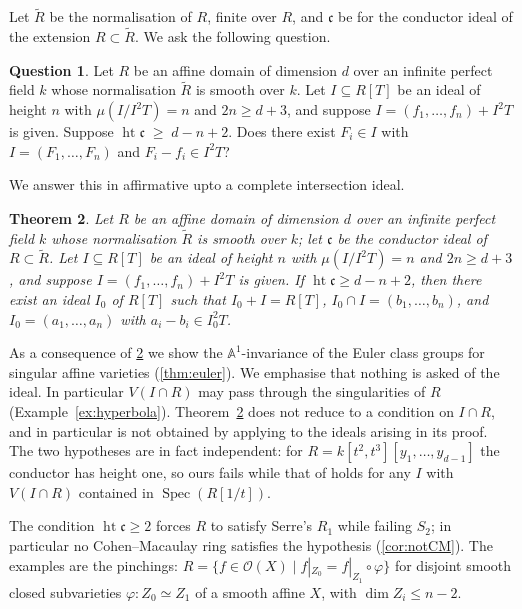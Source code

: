 \documentclass[11pt,reqno]{amsart}
\theoremstyle{plain}
\newtheorem{theorem}{Theorem}[section]
\theoremstyle{definition}
\newtheorem{question}[theorem]{Question}
\newcommand{\Spec}{\operatorname{Spec}}
\newcommand{\hgt}{\operatorname{ht}}
\newcommand{\Rt}{\widetilde{R}}
\newcommand{\cc}{\mathfrak{c}}
\begin{document}
Let $\Rt$ be the
normalisation of $R$, finite over $R$, and $\cc$  be for the conductor ideal of the extension $R\subset  \Rt$. We ask the following question.

\begin{question}\label{thm:question-intro}
Let $R$ be an affine domain of dimension $d$ over an infinite perfect field $k$ whose
normalisation $\Rt$ is smooth over $k$. Let $I\subseteq R[T]$ be an ideal of height $n$ with
$\mu(I/I^2T)=n$ and $2n\ge d+3$, and suppose $I=(f_1,\dots,f_n)+I^2T$ is given. Suppose $\hgt\cc\;\ge\;d-n+2$. Does there exist $F_i\in I$ with $I=(F_1,\dots,F_n)$ and $F_i-f_i\in I^2T$?
\end{question}
We answer this in affirmative upto a complete intersection ideal.
\begin{theorem}\label{thm:main-intro}
Let $R$ be an affine domain of dimension $d$ over an infinite perfect field $k$ whose
normalisation $\Rt$ is smooth over $k$; let $\cc$ be the conductor ideal of $R\subset \Rt$. Let $I\subseteq R[T]$ be an ideal
of height $n$ with $\mu(I/I^2T)=n$ and $2n\ge d+3$, and suppose $I=(f_1,\dots,f_n)+I^2T$ is
given. If $\hgt\cc\ge d-n+2$, then there exist an ideal $I_0$ of $R[T]$ such that $I_0+I=R[T]$, $I_0\cap I=(b_1,\ldots,b_n)$, and $I_0=(a_1,\ldots,a_n)$ with $a_i-b_i\in I_0^2T$.

\end{theorem}
As a consequence of \ref{thm:main-intro} we show the $\mathbb{A}^1$-invariance of the Euler class groups for singular affine varieties (\ref{thm:euler}).
We emphasise that nothing is asked of the
ideal. In particular $V(I\cap R)$ may pass through the singularities of $R$ (Example~\ref{ex:hyperbola}). Theorem~\ref{thm:main-intro} does not reduce to a condition on $I\cap R$, and in particular is
not obtained by applying \cite[Theorem 4.5]{BD} to the ideals arising in its proof. The two
hypotheses are in fact independent: for $R=k[t^2,t^3][y_1,\dots,y_{d-1}]$ the conductor has
height one, so ours fails while that of \cite{BD} holds for any $I$ with $V(I\cap R)$
contained in $\Spec(R[1/t])$.



The condition $\hgt\cc\ge 2$
forces $R$ to satisfy Serre's $R_1$ while failing $S_2$; in particular no
Cohen--Macaulay ring satisfies the hypothesis (\ref{cor:notCM}). The examples are the pinchings: $R=\{f\in\mathcal{O}(X)\mid
f|_{Z_0}=f|_{Z_1}\circ\varphi\}$ for disjoint smooth closed subvarieties $\varphi: Z_0\simeq Z_1$ of a
smooth affine $X$, with $\dim Z_i\le n-2$.
\end{document}
